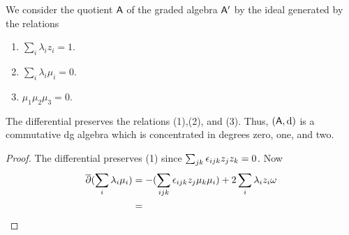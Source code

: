 \documentclass[11pt]{amsart}
\begin{document}
We consider the quotient $\mathsf A$ of the graded algebra $\mathsf A'$ by the ideal generated by the relations
\begin{enumerate}
\item $\sum_i \lambda_i z_i = 1$.
\item $\sum_i \lambda_i \mu_i = 0$.
\item $\mu_1 \mu_2 \mu_3 = 0$. 
\end{enumerate}

\begin{lem}
The differential preserves the relations (1),(2), and (3).
Thus, $(\mathsf A, {\rm d})$ is a commutative dg algebra which is concentrated in degrees zero, one, and two.
\end{lem}
\begin{proof}
The differential preserves (1) since $\sum_{jk} {\epsilon}_{ijk} z_j z_k = 0$.
Now
\begin{align*}
\overline{\partial}( \sum_i \lambda_i \mu_i ) & = - (\sum_{ijk} {\epsilon}_{ijk} z_j \mu_k \mu_i) + 2\sum_i \lambda_i z_i \omega \\
& = 
\end{align*} 
\end{proof}


\end{document}

